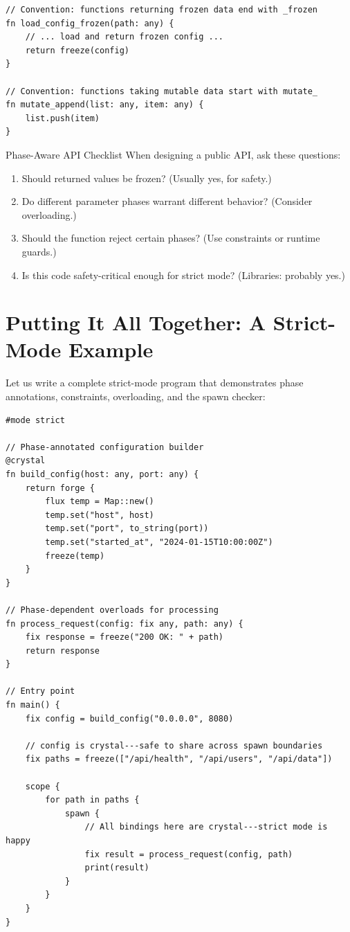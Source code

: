 \begin{lstlisting}[language=Lattice, caption={Phase documentation conventions}]
// Convention: functions returning frozen data end with _frozen
fn load_config_frozen(path: any) {
    // ... load and return frozen config ...
    return freeze(config)
}

// Convention: functions taking mutable data start with mutate_
fn mutate_append(list: any, item: any) {
    list.push(item)
}
\end{lstlisting}

\begin{tipbox}{Phase-Aware API Checklist}
When designing a public API, ask these questions:
\begin{enumerate}
  \item Should returned values be frozen? (Usually yes, for safety.)
  \item Do different parameter phases warrant different behavior? (Consider overloading.)
  \item Should the function reject certain phases? (Use constraints or runtime guards.)
  \item Is this code safety-critical enough for strict mode? (Libraries: probably yes.)
\end{enumerate}
\end{tipbox}

\section{Putting It All Together: A Strict-Mode Example}\label{sec:strict-mode-example}

Let us write a complete strict-mode program that demonstrates phase annotations, constraints, overloading, and the spawn checker:

\begin{lstlisting}[language=Lattice, caption={A complete strict-mode program}]
#mode strict

// Phase-annotated configuration builder
@crystal
fn build_config(host: any, port: any) {
    return forge {
        flux temp = Map::new()
        temp.set("host", host)
        temp.set("port", to_string(port))
        temp.set("started_at", "2024-01-15T10:00:00Z")
        freeze(temp)
    }
}

// Phase-dependent overloads for processing
fn process_request(config: fix any, path: any) {
    fix response = freeze("200 OK: " + path)
    return response
}

// Entry point
fn main() {
    fix config = build_config("0.0.0.0", 8080)

    // config is crystal---safe to share across spawn boundaries
    fix paths = freeze(["/api/health", "/api/users", "/api/data"])

    scope {
        for path in paths {
            spawn {
                // All bindings here are crystal---strict mode is happy
                fix result = process_request(config, path)
                print(result)
            }
        }
    }
}
\end{lstlisting}

